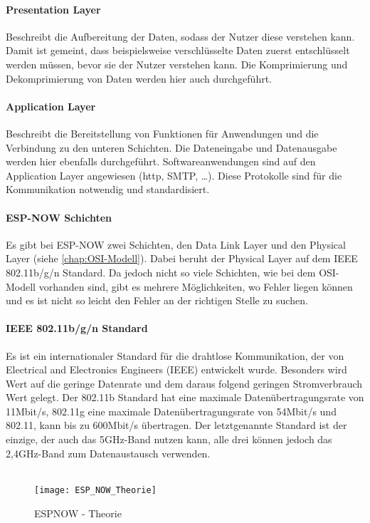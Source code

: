 \documentclass[titlepage,12pt,twoside]{article}
\begin{document}
\paragraph{Presentation Layer}
\label{par:Presentation Layer}
\hfill \break
\hfill \break
Beschreibt die Aufbereitung der Daten, sodass der Nutzer diese verstehen kann. Damit 
ist gemeint, dass beispielsweise verschlüsselte Daten zuerst entschlüsselt werden 
müssen, bevor sie der Nutzer verstehen kann. Die Komprimierung und Dekomprimierung 
von Daten werden hier auch durchgeführt. \\

\paragraph{Application Layer}
\label{par:Application Layer}
\hfill \break
\hfill \break
Beschreibt die Bereitstellung von Funktionen für Anwendungen und die Verbindung zu 
den unteren Schichten. Die Dateneingabe und Datenausgabe werden hier ebenfalls 
durchgeführt. Softwareanwendungen sind auf den Application Layer angewiesen (http, SMTP, …). 
Diese Protokolle sind für die Kommunikation notwendig und standardisiert. \\

\paragraph{ESP-NOW Schichten}
\hfill \break
\hfill \break
Es gibt bei ESP-NOW zwei Schichten, den Data Link Layer und den Physical Layer 
(siehe \autoref{chap:OSI-Modell}). Dabei beruht der Physical Layer auf dem IEEE 802.11b/g/n Standard. 
Da jedoch nicht so viele Schichten, wie bei dem OSI-Modell vorhanden sind, gibt es 
mehrere Möglichkeiten, wo Fehler liegen können und es ist nicht so leicht den Fehler 
an der richtigen Stelle zu suchen. \\

\paragraph{IEEE 802.11b/g/n Standard}
\label{par:802.11b/g/n Standard}
\hfill \break
\hfill \break
Es ist ein internationaler Standard für die drahtlose Kommunikation, der von 
Electrical and Electronics Engineers (IEEE) entwickelt wurde. Besonders wird Wert auf 
die geringe Datenrate und dem daraus folgend geringen Stromverbrauch Wert gelegt. Der 
802.11b Standard hat eine maximale Datenübertragungsrate von 11Mbit/s, 802.11g eine 
maximale Datenübertragungsrate von 54Mbit/s und 802.11, kann bis zu 600Mbit/s übertragen. 
Der letztgenannte Standard ist der einzige, der auch das 5GHz-Band nutzen kann, alle 
drei können jedoch das 2,4GHz-Band zum Datenaustausch verwenden.  \\
\\
\begin{figure}[H]
	\begin{center}
		\scalebox{0.8}
		{\texttt{[image: ESP\_NOW\_Theorie]}}
		\caption{ESPNOW - Theorie}
		\label{fig:ESP_NOW_Theorie}
	\end{center}
\end{figure}
\hfill \break
\end{document}
